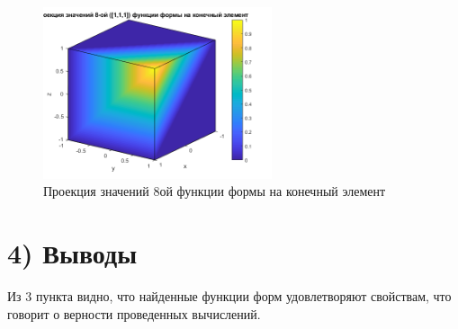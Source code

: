 \documentclass[]{article}
\begin{document}
			\begin{center}
				\begin{figure}[H]
					\centering
					\includegraphics[width=0.6\textwidth]{8}
					\caption{Проекция значений 8ой функции формы на конечный элемент}
					\label{рис. 10}
				\end{figure}
			\end{center}
		\section*{4) Выводы}
		Из 3 пункта видно, что найденные функции форм удовлетворяют свойствам, что говорит о верности проведенных вычислений.
		\newpage
\end{document}
